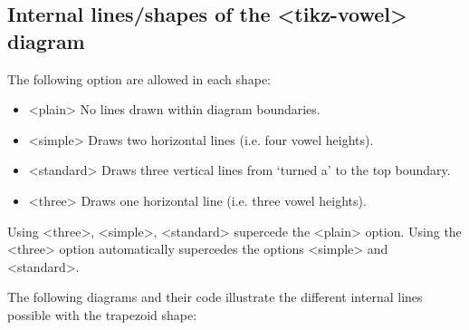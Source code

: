 \documentclass{article}
\newcommand{\pkg}[1]{\texttt{#1}}
\def\\{}%
\def\texttt#1{<#1>}%
\begin{document}
\subsection{Internal lines/shapes of the \pkg{tikz-vowel} diagram}
\label{sec:Internal lines/shapes of the tikz-vowel diagram}

The following option are allowed in each shape:

\begin{itemize}\itemsep0pt
	\item \texttt{plain} \\\qquad No lines drawn within diagram boundaries.
	\item \texttt{simple} \\\qquad Draws two horizontal lines (i.e. four vowel heights).
	\item \texttt{standard} \\\qquad Draws three vertical lines from `turned a' to the top boundary.
	\item \texttt{three} \\\qquad Draws one horizontal line (i.e. three vowel heights).
\end{itemize}

Using \texttt{three}, \texttt{simple}, \texttt{standard} supercede the \texttt{plain} option.  Using the \texttt{three} option automatically supercedes the options \texttt{simple} and \texttt{standard}.

\noindent
The following diagrams and their code illustrate the different internal lines possible with the trapezoid shape:
\end{document}
